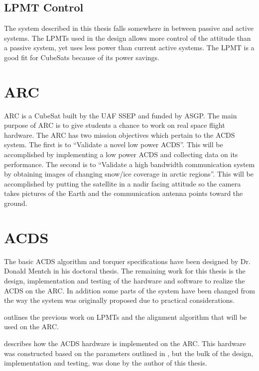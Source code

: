 \subsection{\acl*{LPMT} Control}

The system described in this thesis falls somewhere in between passive and active systems. The \acp{LPMT} used in the design allows more control of the attitude than a passive system, yet uses less power than current active systems. The \ac{LPMT} is a good fit for CubeSats because of its power savings.

\section{\acl*{ARC}}

\ac{ARC} is a CubeSat built by the UAF \ac{SSEP} and funded by \ac{ASGP}. The main purpose of \ac{ARC} is to give students a chance to work on real space flight hardware. The \ac{ARC} has two mission objectives which pertain to the \ac{ACDS} system. The first is to \enquote{Validate a novel low power \ac{ACDS}}\cite{ARCweb}. This will be accomplished by implementing a low power \ac{ACDS} and collecting data on its performance. The second is to \enquote{Validate a high bandwidth communication system by obtaining images of changing snow/ice coverage in arctic regions}\cite{ARCweb}. This will be accomplished by putting the satellite in a nadir facing attitude so the camera takes pictures of the Earth and the communication antenna points toward the ground.

\section{\acl*{ACDS}}

The basic \ac{ACDS} algorithm and torquer specifications have been designed by Dr. Donald Mentch in his doctoral thesis\cite{Mentch11}. The remaining work for this thesis is the design, implementation and testing of the hardware and software to realize the \ac{ACDS} on the \ac{ARC}. In addition some parts of the system have been changed from the way the system was originally proposed due to practical considerations.

 outlines the previous work on \acp{LPMT} and the alignment algorithm that will be used on the \ac{ARC}.

 describes how the \ac{ACDS} hardware is implemented on the \ac{ARC}. This hardware was constructed based on the parameters outlined in \cite{Mentch11}, but the bulk of the design, implementation and testing, was done by the author of this thesis.

